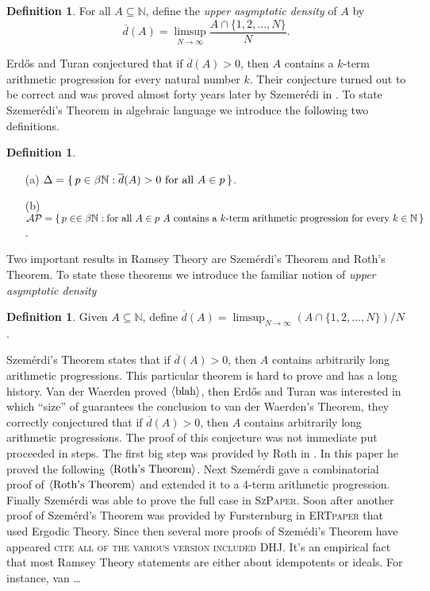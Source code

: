 \documentclass[12pt]{article}
\theoremstyle{plain}
\theoremstyle{definition}
\newtheorem{defn}[thm]{Definition}
\newcommand{\bbN}{\mathbb{N}}
\newcommand{\la}{\langle}
\newcommand{\ra}{\rangle}
\begin{document}
  \begin{defn}
    For all $A \subseteq \bbN$, define the \textsl{upper asymptotic
      density} of $A$ by 
      \[
        \overline{d}(A) = \limsup_{N\to\infty} \frac{A \cap \{1, 2,
          \ldots, N\}}{N}.
      \]
  \end{defn}

Erd\H{o}s and Turan conjectured that if $\overline{d}(A) > 0$, then
$A$ contains a $k$-term arithmetic progression for every natural
number $k$.
Their conjecture turned out to be correct and was proved almost forty
years later by Szemer\'{e}di in \cite{Szemeredi:1975uq}. 
To state Szemer\'{e}di's Theorem in algebraic language we introduce
the following two definitions.
  \begin{defn}
    \begin{itemize}
      \item[(a)] $\Delta = \{\, p \in \beta\bbN : \overline{d}(A) > 0
        \hbox{ for all } A \in p \,\}$.
      \item[(b)] $\mathcal{AP} = \{\, p \in \in \beta\bbN : \hbox{for
          all $A \in p$ } A \hbox{ contains a $k$-term arithmetic
          progression for every $k \in \bbN$} \,\}$.
    \end{itemize}
  \end{defn}

Two important results in Ramsey Theory are Szem\'{e}rdi's Theorem and
Roth's Theorem. 
To state these theorems we introduce the familiar notion of \textsl{upper
asymptotic density}
  \begin{defn}
    Given $A \subseteq \bbN$, define $\overline{d}(A) = \limsup_{N \to
      \infty} (A \cap \{1, 2, \ldots, N\})/ N$.
  \end{defn}
Szem\'{e}rdi's Theorem states that if $\overline{d}(A) > 0$, then $A$
contains arbitrarily long arithmetic progressions. 
This particular theorem is hard to prove and has a long history. 
Van der Waerden proved $\la\hbox{blah}\ra$, then Erd\H{o}s and Turan
was interested in which ``size'' of guarantees the conclusion to van
der Waerden's Theorem, they correctly conjectured that if
$\overline{d}(A) >0$, then $A$ contains arbitrarily long arithmetic
progressions. 
The proof of this conjecture was not immediate put proceeded in
steps. 
The first big step was provided by Roth in \cite{Roth:1953fk}. 
In this paper he proved the following $\la\hbox{Roth's Theorem}\ra$.
Next Szem\'{e}rdi gave a combinatorial proof of $\la\hbox{Roth's
  Theorem}\ra$ and extended it to a 4-term arithmetic progression. 
Finally Szem\'{e}rdi was able to prove the full case in
\textsc{SzPaper}. 
Soon after another proof of Szem\'{e}rd's Theorem was provided by
Fursternburg in \textsc{ERTpaper} that used Ergodic Theory. 
Since then several more proofs of Szem\'{e}di's Theorem have appeared
\textsc{cite all of the various version included DHJ}. 
It's an empirical fact that most Ramsey Theory statements are either
about idempotents or ideals.
For instance, van \dots




\end{document}
